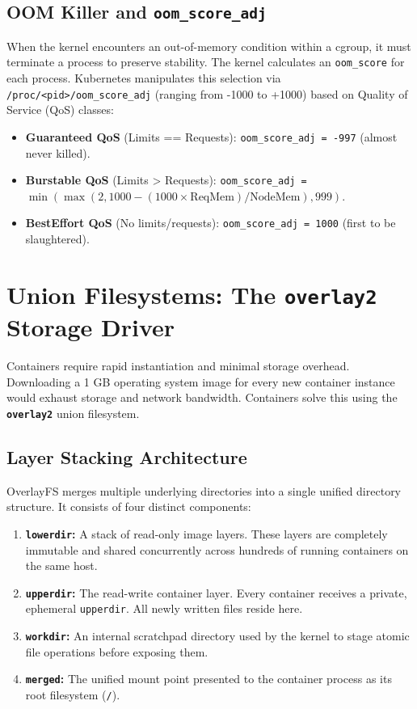 \subsection{OOM Killer and \texttt{oom\_score\_adj}}
When the kernel encounters an out-of-memory condition within a cgroup, it must terminate a process to preserve stability. The kernel calculates an \texttt{oom\_score} for each process. Kubernetes manipulates this selection via \texttt{/proc/<pid>/oom\_score\_adj} (ranging from -1000 to +1000) based on Quality of Service (QoS) classes:
\begin{itemize}[leftmargin=12pt]
  \item \textbf{Guaranteed QoS} (Limits == Requests): \texttt{oom\_score\_adj = -997} (almost never killed).
  \item \textbf{Burstable QoS} (Limits > Requests): \texttt{oom\_score\_adj = $\min(\max(2, 1000 - (1000 \times \text{ReqMem}) / \text{NodeMem}), 999)$}.
  \item \textbf{BestEffort QoS} (No limits/requests): \texttt{oom\_score\_adj = 1000} (first to be slaughtered).
\end{itemize}

\section{Union Filesystems: The \texttt{overlay2} Storage Driver}

Containers require rapid instantiation and minimal storage overhead. Downloading a 1 GB operating system image for every new container instance would exhaust storage and network bandwidth. Containers solve this using the \textbf{\texttt{overlay2}} union filesystem.

\subsection{Layer Stacking Architecture}
OverlayFS merges multiple underlying directories into a single unified directory structure. It consists of four distinct components:
\begin{enumerate}[leftmargin=15pt]
  \item \textbf{\texttt{lowerdir}:} A stack of read-only image layers. These layers are completely immutable and shared concurrently across hundreds of running containers on the same host.
  \item \textbf{\texttt{upperdir}:} The read-write container layer. Every container receives a private, ephemeral \texttt{upperdir}. All newly written files reside here.
  \item \textbf{\texttt{workdir}:} An internal scratchpad directory used by the kernel to stage atomic file operations before exposing them.
  \item \textbf{\texttt{merged}:} The unified mount point presented to the container process as its root filesystem (\texttt{/}).
\end{enumerate}

